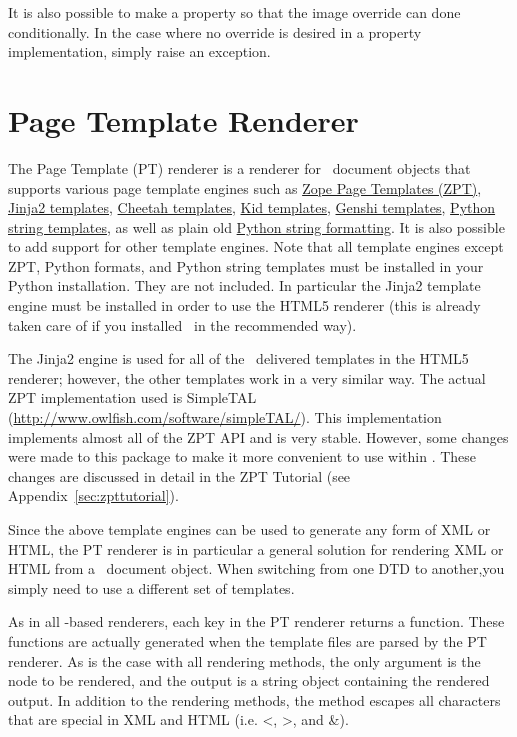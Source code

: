 It is also possible to make  a property
so that the image override can done conditionally.  In the case
where no override is desired in a property implementation, simply
raise an  exception.

\section{Page Template Renderer\label{sec:pt}}

The Page Template (PT) renderer is a renderer for \plasTeX\ document
objects that supports various page template engines such as
\href{http://www.zope.org/Documentation/Books/ZopeBook/2_6Edition/ZPT.stx}{Zope
Page Templates (ZPT)}, \href{http://jinja.pocoo.org/}{Jinja2 templates},
\href{http://www.cheetahtemplate.org/}{Cheetah templates},
\href{http://kid-templating.org/}{Kid templates},
\href{http://genshi.edgewall.org/}{Genshi templates},
\href{http://docs.python.org/lib/node40.html}{Python string templates},
as well as plain old \href{http://docs.python.org/lib/typesseq-strings.html}{Python string formatting}.
It is also possible to add support for other template engines.
Note that all template engines except ZPT, Python formats,
and Python string templates must be installed in your Python installation.
They are not included. In particular the Jinja2 template engine must be
installed in order to use the HTML5 renderer (this is already taken care of
if you installed \plasTeX\ in the recommended way).

The Jinja2 engine is used for all of the \plasTeX\ delivered templates
in the HTML5 renderer; however, the other templates work in a very similar way.
The actual ZPT implementation used is SimpleTAL
(\url{http://www.owlfish.com/software/simpleTAL/}).  This implementation
implements almost all of the ZPT API and is very stable.  However, some
changes were made to this package to make it more convenient to use
within \plasTeX.  These changes are discussed in detail in the
ZPT Tutorial (see Appendix~\ref{sec:zpttutorial}).

Since the above template engines can be used to generate any form of
XML or HTML, the PT renderer is in particular a general solution for rendering
XML or HTML from a \plasTeX\ document object.  When switching from one DTD to
another,you simply need to use a different set of templates.

As in all -based renderers, each key in the PT renderer
returns a function.  These functions are actually generated when the
template files are parsed by the PT renderer.
As is the case with all rendering methods, the only argument is the node to be
rendered, and the output is a string object containing the rendered
output. In addition to the rendering methods, the  method
escapes all characters that are special in XML and HTML (i.e. <, >, and \&).

